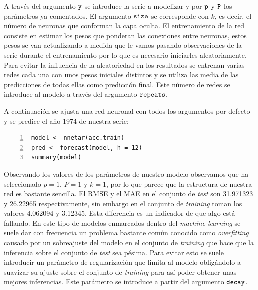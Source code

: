 A través del argumento $\verb!y!$ se introduce la serie a modelizar y por $\verb!p!$ y $\verb!P!$ los parámetros ya comentados. El argumento $\verb!size!$ se corresponde con $k$, es decir, el número de neuronas que conforman la capa oculta. El entrenamiento de la red consiste en estimar los pesos que ponderan las conexiones entre neuronas, estos pesos se van actualizando a medida que le vamos pasando observaciones de la serie durante el entrenamiento por lo que es necesario iniciarles aleatoriamente. Para evitar la influencia de la aleatoriedad en los resultados se entrenan varias redes cada una con unos pesos iniciales distintos y se utiliza las media de las predicciones de todas ellas como predicción final. Este número de redes se introduce al modelo a través del argumento $\verb!repeats!$.

A continuación se ajusta una red neuronal con todos los argumentos por defecto y se predice el año 1974 de nuestra serie:
\begin{Verbatim}[fontsize=\footnotesize, numbers = left]
model <- nnetar(acc.train)
pred <- forecast(model, h = 12)
summary(model)
\end{Verbatim}

Observando los valores de los parámetros de nuestro modelo observamos que ha seleccionado $p = 1$, $P = 1$ y $k = 1$, por lo que parece que la estructura de nuestra red es bastante sencilla. El RMSE y el MAE en el conjunto de \textit{test} son 31.971323 y 26.22965 respectivamente, sin embargo en el conjunto de \textit{training} toman los valores 4.062094 y 3.12345. Esta diferencia es un indicador de que algo está fallando. En este tipo de modelos enmarcados dentro del \textit{machine learning} se suele dar con frecuencia un problema bastante común conocido como \textit{overfitting} causado por un sobreajuste del modelo en el conjunto de \textit{training} que hace que la inferencia sobre el conjunto de \textit{test} sea pésima. Para evitar esto se suele introducir un parámetro de regularización que limita al modelo obligándolo a suavizar su ajuste sobre el conjunto de \textit{training} para así poder obtener unas mejores inferencias. Este parámetro se introduce a partir del argumento $\verb!decay!$.

